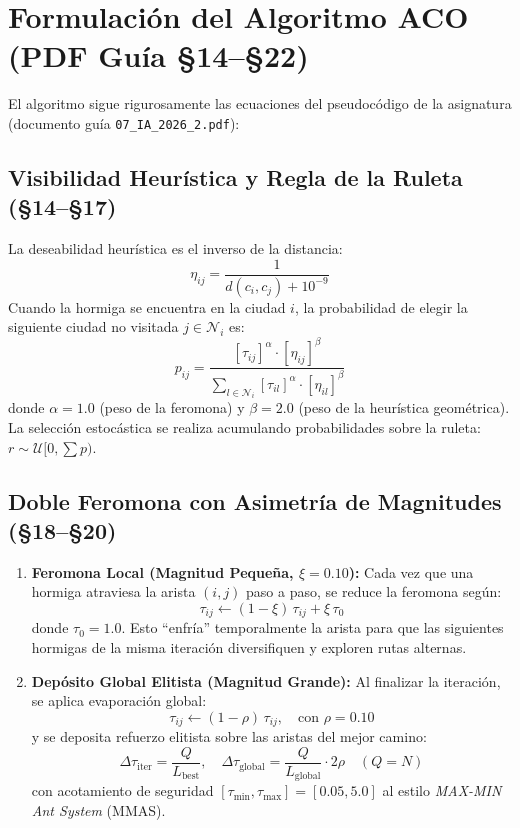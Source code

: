 \documentclass[11pt,a4paper]{article}
\begin{document}
\section{Formulación del Algoritmo ACO (PDF Guía §14--§22)}

El algoritmo sigue rigurosamente las ecuaciones del pseudocódigo de la asignatura (documento guía \texttt{07\_IA\_2026\_2.pdf}):

\subsection{Visibilidad Heurística y Regla de la Ruleta (§14--§17)}
La deseabilidad heurística es el inverso de la distancia:
\begin{equation}
    \eta_{ij} = \frac{1}{d(c_i, c_j) + 10^{-9}}
\end{equation}
Cuando la hormiga se encuentra en la ciudad $i$, la probabilidad de elegir la siguiente ciudad no visitada $j \in \mathcal{N}_i$ es:
\begin{equation}
    p_{ij} = \frac{\left[\tau_{ij}\right]^\alpha \cdot \left[\eta_{ij}\right]^\beta}{\sum_{l \in \mathcal{N}_i} \left[\tau_{il}\right]^\alpha \cdot \left[\eta_{il}\right]^\beta}
\end{equation}
donde $\alpha = 1.0$ (peso de la feromona) y $\beta = 2.0$ (peso de la heurística geométrica). La selección estocástica se realiza acumulando probabilidades sobre la ruleta: $r \sim \mathcal{U}[0, \sum p)$.

\subsection{Doble Feromona con Asimetría de Magnitudes (§18--§20)}
\begin{enumerate}
    \item \textbf{Feromona Local (Magnitud Pequeña, $\xi = 0.10$):} Cada vez que una hormiga atraviesa la arista $(i, j)$ paso a paso, se reduce la feromona según:
    \begin{equation}
        \tau_{ij} \leftarrow (1 - \xi)\,\tau_{ij} + \xi\,\tau_0
    \end{equation}
    donde $\tau_0 = 1.0$. Esto ``enfría'' temporalmente la arista para que las siguientes hormigas de la misma iteración diversifiquen y exploren rutas alternas.
    \item \textbf{Depósito Global Elitista (Magnitud Grande):} Al finalizar la iteración, se aplica evaporación global:
    \begin{equation}
        \tau_{ij} \leftarrow (1 - \rho)\,\tau_{ij}, \quad \text{con } \rho = 0.10
    \end{equation}
    y se deposita refuerzo elitista sobre las aristas del mejor camino:
    \begin{equation}
        \Delta \tau_{\text{iter}} = \frac{Q}{L_{\text{best}}}, \quad \Delta \tau_{\text{global}} = \frac{Q}{L_{\text{global}}} \cdot 2\rho \quad (Q = N)
    \end{equation}
    con acotamiento de seguridad $[\tau_{\min}, \tau_{\max}] = [0.05, 5.0]$ al estilo \emph{MAX-MIN Ant System} (MMAS).
\end{enumerate}
\end{document}
